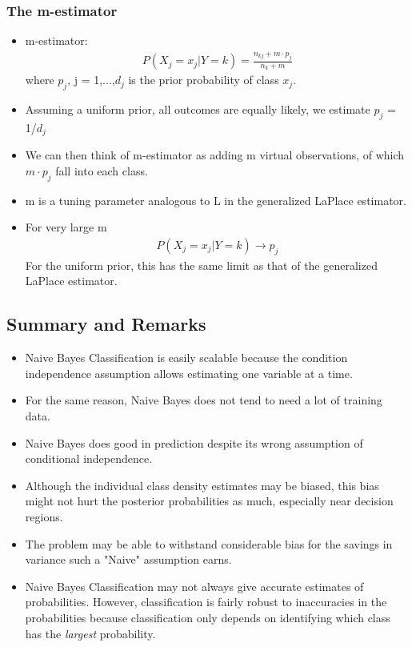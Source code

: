 \documentclass[12pt, oneside]{article}
\begin{document}
\subsubsection{The m-estimator}
\begin{itemize}
    \item m-estimator:
    \begin{align*}
        P(X_j = x_j |Y=k) = \frac{n_{kj} + m \cdot p_j}{n_k + m}
    \end{align*}
    where $p_j$, j = 1,...,$d_j$ is the prior probability of class $x_j$.
    \item Assuming a uniform prior, all outcomes are equally likely, we estimate $p_j$ = 1/$d_j$
    \item We can then think of m-estimator as adding m virtual observations, of which $m \cdot p_j$ fall into each class. 
    \item m is a tuning parameter analogous to L in the generalized LaPlace estimator. 
    \item For very large m
    \begin{align*}
        P(X_j = x_j |Y=k) \rightarrow p_j
    \end{align*}
    For the uniform prior, this has the same limit as that of the generalized LaPlace estimator.
\end{itemize}

\subsection{Summary and Remarks}
\begin{itemize}
    \item Naive Bayes Classification is easily scalable because the condition independence assumption allows estimating one variable at a time.
    \item For the same reason, Naive Bayes does not tend to need a lot of training data.
    \item Naive Bayes does good in prediction despite its wrong assumption of conditional independence. 
    \item Although the individual class density estimates may be biased, this bias might not hurt the posterior probabilities as much, especially near decision regions. 
    \item The problem may be able to withstand considerable bias for the savings in variance such a "Naive" assumption earns. 
    \item Naive Bayes Classification may not always give accurate estimates of probabilities. However, classification is fairly robust to inaccuracies in the probabilities because classification only depends on identifying which class has the \emph{largest} probability. 
\end{itemize}
\end{document}
